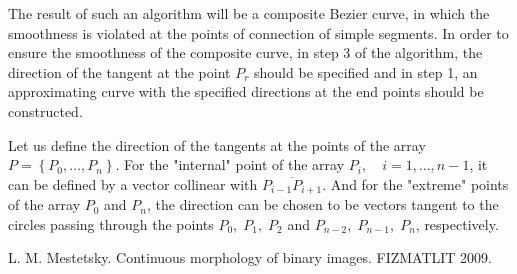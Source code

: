 \documentclass[12pt]{article}
\begin{document}
The result of such an algorithm will be a composite Bezier curve,
in which the smoothness is violated at the points of connection of simple segments.
In order to ensure the smoothness of the composite curve, in step 3 of the algorithm,
the direction of the tangent at the point $P_{r} $ should be specified and in step 1,
an approximating curve with the specified directions at the end points should be constructed.
 
Let us define the direction of the tangents at the points of the array $P=\left\{P_{0} ,\ldots ,P_{n} \right\}$.
For the "internal" point of the array $P{}_{i} ,\quad i=1,\ldots ,n-1$, it can be defined by a vector
collinear with $\overline{P_{i-1} P_{i+1} }$. And for the "extreme" points of the array $P_{0} $ and $P_{n} $,
the direction can be chosen to be vectors tangent to the circles passing through the points
$P_{0} ,\; P_{1} ,\; P_{2} $ and $P_{n-2} ,\; P_{n-1} ,\; P_{n} $, respectively.

 \begin{thebibliography}{99}
  
L. M. Mestetsky. Continuous morphology of binary images. FIZMATLIT 2009.

\end{thebibliography}
\end{document}
